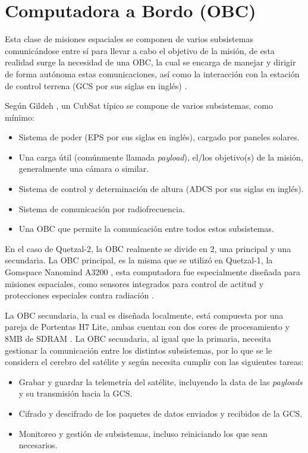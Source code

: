 \section{Computadora a Bordo (OBC)}

  Esta clase de misiones espaciales se componen de varios subsistemas comunicándose entre sí para llevar a cabo el objetivo de la misión, de esta realidad surge la necesidad de una OBC, la cual se encarga de manejar y dirigir de forma autónoma estas comunicaciones, así como la interacción con la estación de control terrena (GCS por sus siglas en inglés) \cite{lwabanji_wilkinson_biermann_bellville_2013}.

  Según Gildeh \cite{gildeh_2003}, un CubSat típico se compone de varios subsistemas, como mínimo:
\begin{itemize}
  \item Sistema de poder (EPS por sus siglas en inglés), cargado por paneles solares.
  \item Una carga útil (comúnmente llamada \textit{payload}), el/los objetivo(s) de la misión, generalmente una cámara o similar.
  \item Sistema de control y determinación de altura (ADCS por sus siglas en inglés).
  \item Sistema de comunicación por radiofrecuencia.
  \item Una OBC que permite la comunicación entre todos estos subsistemas.
\end{itemize}

  En el caso de Quetzal-2, la OBC realmente se divide en 2, una principal y una secundaria. La OBC principal, es la misma que se utilizó en Quetzal-1, la Gomspace Nanomind A3200 \cite{ayerdi_2023}, esta computadora fue especialmente diseñada para misiones espaciales, como sensores integrados para control de actitud y protecciones especiales contra radiación \cite{gomspace_2026}.

  La OBC secundaria, la cual es diseñada localmente, está compuesta por una pareja de Portentas H7 Lite, ambas cuentan con dos cores de procesamiento y 8MB de SDRAM \cite{arduino_2026}. La OBC secundaria, al igual que la primaria, necesita gestionar la comunicación entre los distintos subsistemas, por lo que se le considera el cerebro del satélite \cite{lwabanji_wilkinson_biermann_bellville_2013} y según \cite{stras2003design} necesita cumplir con las siguientes tareas:
\begin{itemize}
	\item {Grabar y guardar la telemetría del satélite, incluyendo la data de las \textit{payloads} y su transmisión hacia la GCS.}
  \item {Cifrado y descifrado de los paquetes de datos enviados y recibidos de la GCS.}
  \item {Monitoreo y gestión de subsistemas, incluso reiniciando los que sean necesarios.}
\end{itemize}


